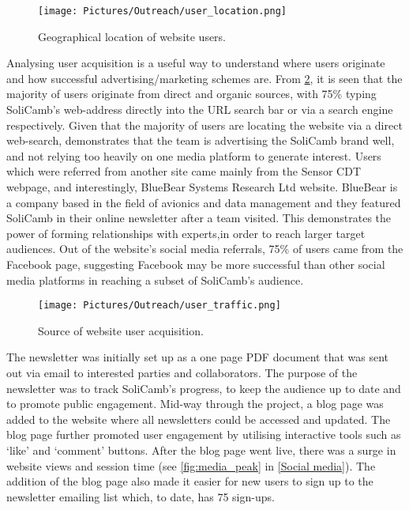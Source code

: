     \begin{figure}[ht]
    	\centering
    	\texttt{[image: Pictures/Outreach/user\_location.png]}
    	\captionsetup{justification = centering}
    	\caption{Geographical location of website users.}
    	\label{fig:user_location}
     \end{figure}
        
    Analysing user acquisition is a useful way to understand where users originate and how successful advertising/marketing schemes are. From  \cref{fig:user_traffic}, it is seen that the majority of users originate from direct and organic sources, with 75\% typing SoliCamb's web-address directly into the URL search bar or via a search engine respectively. Given that the majority of users are locating the website via a direct web-search, demonstrates that the team is advertising the SoliCamb brand well, and not relying too heavily on one media platform to generate interest. Users which were referred from another site came mainly from the Sensor CDT webpage, and interestingly, BlueBear Systems Research Ltd website. BlueBear is a company based in the field of avionics and data management and they featured SoliCamb in their online newsletter after a team visited. This demonstrates the power of forming relationships with experts,in order to reach larger target audiences. Out of the website's social media referrals, 75\% of users came from the Facebook page, suggesting Facebook may be more successful than other social media platforms in reaching a subset of SoliCamb's audience. 
       
    
        \begin{figure}[ht]
    	\centering
    	\texttt{[image: Pictures/Outreach/user\_traffic.png]}
    	\captionsetup{justification = centering}
    	\caption{Source of website user acquisition.}
    	\label{fig:user_traffic}
     \end{figure}
     
    The newsletter was initially set up as a one page PDF document that was sent out via email to interested parties and collaborators. The purpose of the newsletter was to track SoliCamb's progress, to keep the audience up to date and to promote public engagement. Mid-way through the project, a blog page was added to the website where all newsletters could be accessed and updated. The blog page  further promoted user engagement by utilising interactive tools such as `like' and `comment' buttons. After the blog page went live, there was a surge in website views and session time (see \cref{fig:media_peak} in \cref{Social media}). The addition of the blog page also made it easier for new users to sign up to the newsletter emailing list which, to date, has 75 sign-ups. 

